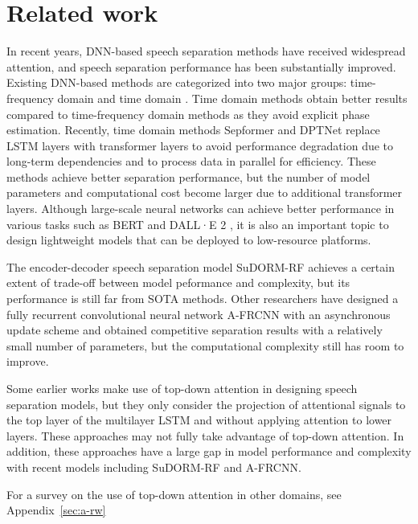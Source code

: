 \documentclass{article} \usepackage{iclr2023_conference,times}
\begin{document}
\section{Related work}
In recent years, DNN-based speech separation methods have received widespread attention, and speech separation performance has been substantially improved. Existing DNN-based methods are categorized into two major groups: time-frequency domain \citep{hershey2016deep,chen2017deep,yu2017permutation} and time domain \citep{luo2019conv, luo2020dual, tzinis2020sudo, Chen2020, subakan2021attention, hu2021speech}. Time domain methods obtain better results compared to time-frequency domain methods as they avoid explicit phase estimation.
Recently, time domain methods Sepformer \citep{subakan2021attention} and DPTNet \citep{Chen2020} replace LSTM layers with transformer layers to avoid performance degradation due to long-term dependencies and to process data in parallel for efficiency. These methods achieve better separation performance, but the number of model parameters and computational cost become larger due to additional transformer layers. Although large-scale neural networks can achieve better performance in various tasks such as BERT \citep{bert} and DALL·E 2 \citep{ramesh2022hierarchical}, it is also an important topic to design lightweight models that can be deployed to low-resource platforms.

The encoder-decoder speech separation model SuDORM-RF \citep{tzinis2020sudo} achieves a certain extent of trade-off between model peformance and complexity, but its performance is still far from SOTA methods. Other researchers have designed a fully recurrent convolutional neural network A-FRCNN \citep{hu2021speech} with an asynchronous update scheme and obtained competitive separation results with a relatively small number of parameters, but the computational complexity still has room to improve. 


Some earlier works \citep{xu2018modeling, shi2018listen, shi2019ones} make use of top-down attention in designing speech separation models, but they only consider the projection of attentional signals to the top layer of the multilayer LSTM and without applying attention to lower layers. These approaches may not fully take advantage of top-down attention. In addition, these approaches have a large gap in model performance and complexity with recent models including SuDORM-RF and A-FRCNN. 

For a survey on the use of top-down attention in other domains, see Appendix~\ref{sec:a-rw}
\end{document}
